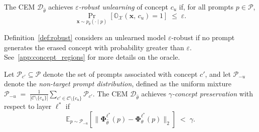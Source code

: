 \begin{definition}
\label{def:robust}
The CEM $\mathcal{D}_{\hat\theta}$ achieves \emph{$\varepsilon$-robust unlearning} of concept $c_u$ if, for all prompts $p \in \mathcal{P}$,%
\begin{equation}
    \Pr_{\mathbf{x} \sim p_{\hat\theta}(\cdot \mid p)}
\!\left[
\mathbb{O}_{\mathcal{X}}(\mathbf{x} ,\, c_u) = 1
\right]
\;\leq\; \varepsilon.
\end{equation}
\end{definition}
 Definition~\ref{def:robust} considers an unlearned model $\varepsilon$-robust if no prompt generates the erased concept with probability greater than $\varepsilon$. See~\cref{app:concept_regions} for more details on the oracle.

\begin{definition}
\label{def:neighbor}
Let $\mathcal{P}_{c'} \subseteq \mathcal{P}$ denote the set of prompts associated with concept $c'$, and let $\mathcal{P}_{-u}$ denote the \emph{non-target prompt distribution}, defined as the uniform mixture
$\mathcal{P}_{-u} \;=\; \tfrac{1}{|\mathcal{C}\setminus\{c_u\}|}\sum_{c' \in \mathcal{C}\setminus\{c_u\}} \mathcal{P}_{c'}$.
The CEM $\mathcal{D}_{\hat\theta}$ achieves \emph{$\gamma$-concept preservation} with respect to layer ${\ell^*}$ if
\begin{equation}
    \mathbb{E}_{p \sim \mathcal{P}_{-u}}\!\left[\bigl\|\boldsymbol{\Phi}^{\ell^*}_{\hat\theta}(p) - \boldsymbol{\Phi}^{\ell^*}_\theta(p)\bigr\|_2\right]
    \;<\; \gamma.
\end{equation}
\end{definition}

